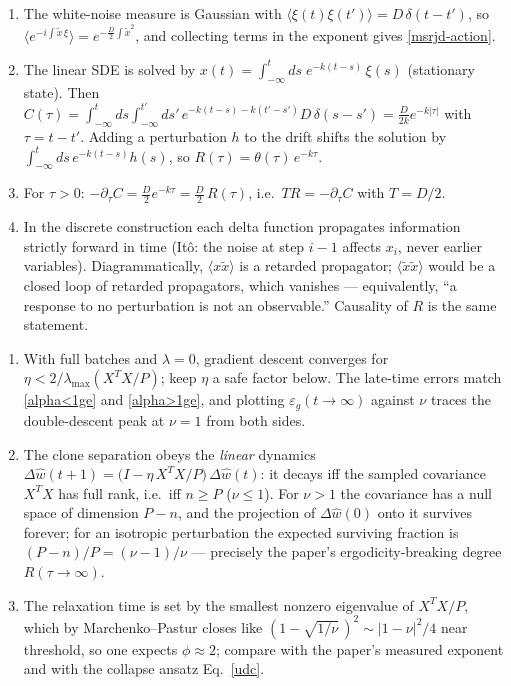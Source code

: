 \documentclass[11pt]{article}
\newcommand{\pd}{\partial}
\begin{document}
\begin{solution}[ex:msrjd]
\begin{enumerate}
  \item The white-noise measure is Gaussian with $\langle \xi(t)\xi(t')\rangle = D\,\delta(t-t')$, so $\big\langle e^{-i\int \tilde x\, \xi}\big\rangle = e^{-\frac{D}{2}\int \tilde x^2}$, and collecting terms in the exponent gives \eqref{msrjd-action}.
  \item The linear SDE is solved by $x(t) = \int_{-\infty}^{t} ds\; e^{-k(t-s)}\,\xi(s)$ (stationary state). Then
$C(\tau) = \int_{-\infty}^{t}ds\int_{-\infty}^{t'}ds'\, e^{-k(t-s)-k(t'-s')} D\,\delta(s-s') = \frac{D}{2k}e^{-k|\tau|}$ with $\tau = t-t'$.
Adding a perturbation $h$ to the drift shifts the solution by $\int_{-\infty}^t ds\, e^{-k(t-s)}h(s)$, so $R(\tau) = \theta(\tau)\, e^{-k\tau}$.
  \item For $\tau>0$: $-\pd_\tau C = \frac{D}{2}e^{-k\tau} = \frac{D}{2}\,R(\tau)$, i.e.\ $T R = -\pd_\tau C$ with $T = D/2$.
  \item In the discrete construction each delta function propagates information strictly forward in time (It\^o: the noise at step $i-1$ affects $x_i$, never earlier variables). Diagrammatically, $\langle x \tilde x\rangle$ is a retarded propagator; $\langle \tilde x\tilde x\rangle$ would be a closed loop of retarded propagators, which vanishes --- equivalently, ``a response to no perturbation is not an observable.'' Causality of $R$ is the same statement.
\end{enumerate}
\end{solution}

\begin{solution}[ex:li-goldenfeld]
\begin{enumerate}
  \item With full batches and $\lambda=0$, gradient descent converges for $\eta < 2/\lambda_{\max}(X^TX/P)$; keep $\eta$ a safe factor below. The late-time errors match \eqref{alpha<1ge} and \eqref{alpha>1ge}, and plotting $\varepsilon_g(t\to\infty)$ against $\nu$ traces the double-descent peak at $\nu=1$ from both sides.
  \item The clone separation obeys the \emph{linear} dynamics $\Delta\hat w(t+1) = \big(I - \eta\, X^TX/P\big)\,\Delta\hat w(t)$: it decays iff the sampled covariance $X^TX$ has full rank, i.e.\ iff $n \ge P$ ($\nu\le1$). For $\nu>1$ the covariance has a null space of dimension $P-n$, and the projection of $\Delta\hat w(0)$ onto it survives forever; for an isotropic perturbation the expected surviving fraction is $(P-n)/P = (\nu-1)/\nu$ --- precisely the paper's ergodicity-breaking degree $R(\tau\to\infty)$.
  \item The relaxation time is set by the smallest nonzero eigenvalue of $X^TX/P$, which by Marchenko--Pastur closes like $(1-\sqrt{1/\nu}\,)^2 \sim |1-\nu|^2/4$ near threshold, so one expects $\phi \approx 2$; compare with the paper's measured exponent and with the collapse ansatz Eq.~\eqref{udc}.
\end{enumerate}
\end{solution}
\end{document}
